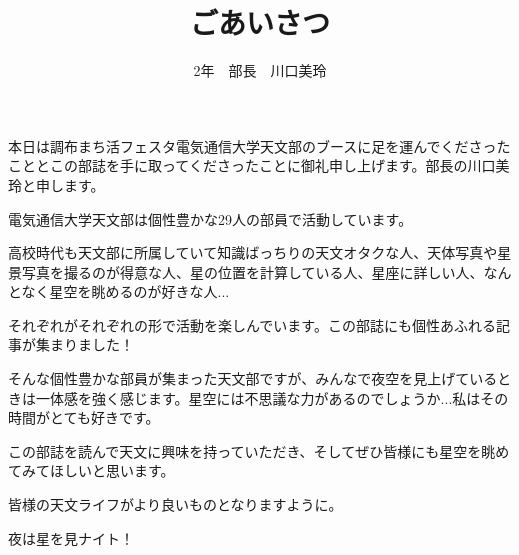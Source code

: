 \documentclass[a4paper,10pt]{jarticle}
\begin{document}
 
\title{ごあいさつ}
\author{2年　部長　川口美玲}
\date{}
\maketitle

\begin{center}


\phantom{a}\par
本日は調布まち活フェスタ電気通信大学天文部のブースに足を運んでくださったこととこの部誌を手に取ってくださったことに御礼申し上げます。部長の川口美玲と申します。


\phantom{a}\par
電気通信大学天文部は個性豊かな29人の部員で活動しています。


\phantom{a}\par
高校時代も天文部に所属していて知識ばっちりの天文オタクな人、天体写真や星景写真を撮るのが得意な人、星の位置を計算している人、星座に詳しい人、なんとなく星空を眺めるのが好きな人...


\phantom{a}\par
それぞれがそれぞれの形で活動を楽しんでいます。この部誌にも個性あふれる記事が集まりました！


\phantom{a}\par
そんな個性豊かな部員が集まった天文部ですが、みんなで夜空を見上げているときは一体感を強く感じます。星空には不思議な力があるのでしょうか...私はその時間がとても好きです。


\phantom{a}\par
この部誌を読んで天文に興味を持っていただき、そしてぜひ皆様にも星空を眺めてみてほしいと思います。


\phantom{a}\par
皆様の天文ライフがより良いものとなりますように。


\phantom{a}\par
夜は星を見ナイト！


\end{center}
\end{document}
